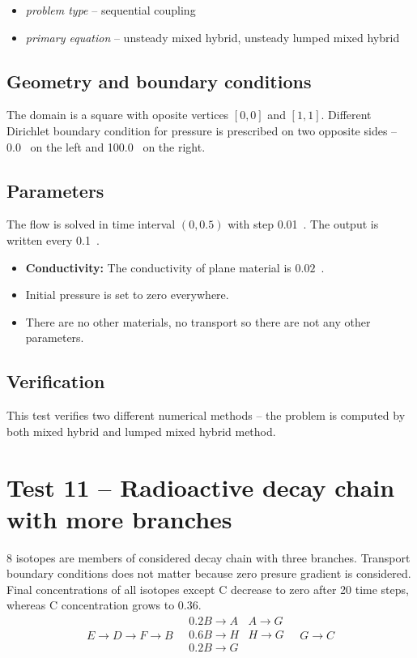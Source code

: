 \begin{itemize} 
    \item \emph{problem type} -- sequential coupling
    \item \emph{primary equation} -- unsteady mixed hybrid, unsteady lumped mixed hybrid
  \end{itemize}

\subsection*{Geometry and boundary conditions}
The domain is a square with oposite vertices $[0,0]$ and $[1,1]$. Different Dirichlet boundary condition for 
pressure is prescribed on two opposite sides -- 0.0~ on the left and 100.0~ on the right.

\subsection*{Parameters}
The flow is solved in time interval $(0,0.5)$ with step 0.01~. The output is written every 0.1~.
\begin{itemize}
  \item \textbf{Conductivity:} The conductivity of plane material is $0.02$~.
  \item Initial pressure is set to zero everywhere.
  \item There are no other materials, no transport so there are not any other parameters.
\end{itemize}

\subsection*{Verification}
This test verifies two different numerical methods -- the problem is computed by both mixed hybrid and lumped mixed hybrid method.


\section{Test 11 -- Radioactive decay chain with more branches}
8 isotopes are members of considered decay chain with three branches. Transport boundary conditions does not matter 
because zero presure gradient is considered. Final concentrations of all isotopes except C decrease to zero after 20 
time steps, whereas C concentration grows to 0.36.
\[
 E\xrightarrow{}D\xrightarrow{}F\xrightarrow{}B
 \quad
 \begin{matrix}
    0.2B\xrightarrow{}A & A\xrightarrow{}G \\
    0.6B\xrightarrow{}H & H\xrightarrow{}G \\
    0.2B\xrightarrow{}G &\\
 \end{matrix}
 \quad
 G\xrightarrow{}C 
\]

